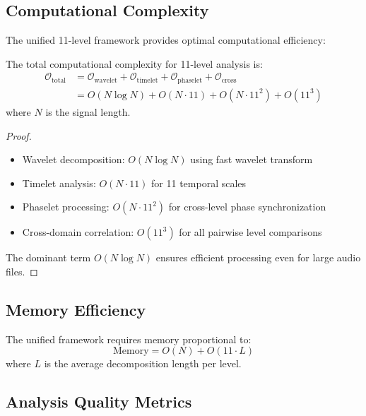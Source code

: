 \subsection{Computational Complexity}

The unified 11-level framework provides optimal computational efficiency:

\begin{theorem}
The total computational complexity for 11-level analysis is:
\begin{align}
\mathcal{O}_{\text{total}} &= \mathcal{O}_{\text{wavelet}} + \mathcal{O}_{\text{timelet}} + \mathcal{O}_{\text{phaselet}} + \mathcal{O}_{\text{cross}} \\
&= O(N \log N) + O(N \cdot 11) + O(N \cdot 11^2) + O(11^3)
\end{align}
where $N$ is the signal length.
\end{theorem}

\begin{proof}
\begin{itemize}
    \item Wavelet decomposition: $O(N \log N)$ using fast wavelet transform
    \item Timelet analysis: $O(N \cdot 11)$ for 11 temporal scales
    \item Phaselet processing: $O(N \cdot 11^2)$ for cross-level phase synchronization
    \item Cross-domain correlation: $O(11^3)$ for all pairwise level comparisons
\end{itemize}
The dominant term $O(N \log N)$ ensures efficient processing even for large audio files.
\end{proof}

\subsection{Memory Efficiency}

\begin{theorem}
The unified framework requires memory proportional to:
\begin{equation}
\text{Memory} = O(N) + O(11 \cdot L)
\end{equation}
where $L$ is the average decomposition length per level.
\end{theorem}

\subsection{Analysis Quality Metrics}

